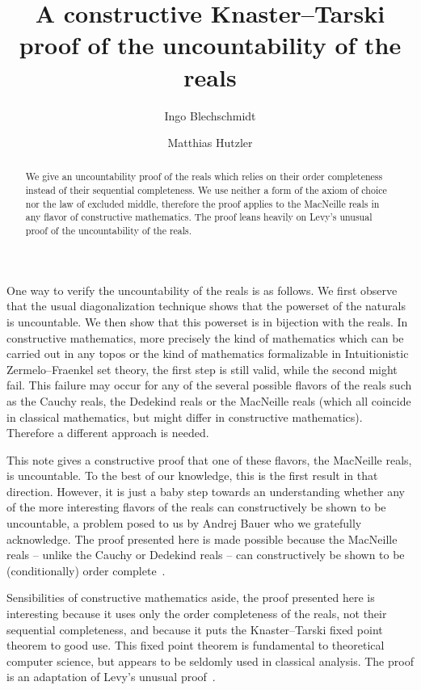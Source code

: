 \documentclass[oneside]{amsart}
\title[]{A constructive Knaster--Tarski proof of the uncountability of the reals}
\author{Ingo Blechschmidt}
\author{Matthias Hutzler}
\theoremstyle{definition}
\theoremstyle{plain}
\theoremstyle{remark}
\begin{document}
\begin{abstract}
  We give an uncountability proof of the reals which relies on their
  order completeness instead of their sequential completeness. We use neither a
  form of the axiom of choice nor the law of excluded middle, therefore
  the proof applies to the MacNeille reals in any flavor of constructive
  mathematics. The proof leans heavily on Levy's unusual proof of the
  uncountability of the reals.
\end{abstract}

\maketitle
\thispagestyle{empty}

One way to verify the uncountability of the reals is as follows. We first
observe that the usual diagonalization technique shows that the powerset of the
naturals is uncountable. We then show that this powerset is in bijection with
the reals. In constructive mathematics, more precisely the kind of mathematics
which can be carried out in any topos or the kind of mathematics formalizable
in Intuitionistic Zermelo--Fraenkel set theory, the first step is still valid, while the
second might fail. This failure may occur for any of the several possible flavors of the reals
such as the Cauchy reals, the Dedekind reals or the MacNeille reals (which all
coincide in classical mathematics, but might differ in constructive
mathematics). Therefore a different approach is needed.

This note gives a constructive proof that one of these flavors,
the MacNeille reals, is uncountable. To the best of our knowledge, this
is the first result in that direction. However, it is just a baby step towards
an understanding whether any of the more interesting flavors of the reals can constructively be
shown to be uncountable, a problem posed to us by Andrej Bauer who we
gratefully acknowledge. The proof presented here is made possible because the
MacNeille reals -- unlike the Cauchy or Dedekind reals -- can constructively be
shown to be (conditionally) order complete~\cite[Lemma~D4.7.7]{johnstone:elephant}.

Sensibilities of constructive mathematics aside, the proof presented here is
interesting because it uses only the order completeness of the reals, not their
sequential completeness, and because it puts the Knaster--Tarski fixed point
theorem to good use. This fixed point theorem is fundamental to theoretical
computer science, but appears to be seldomly used in classical analysis.
The proof is an adaptation of Levy's unusual proof~\cite{levy:uncountability}.
\end{document}
